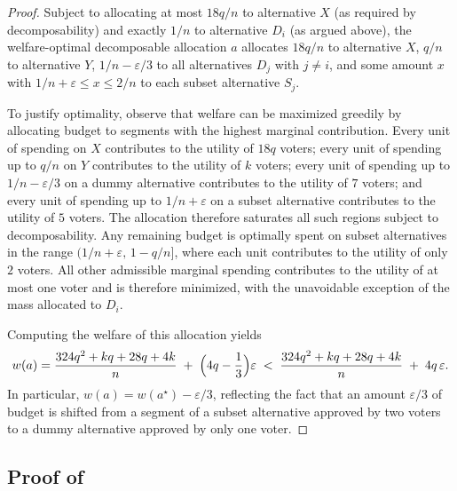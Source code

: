 \documentclass[11pt]{article}
\begin{document}
\begin{proof}
Subject to allocating at most $18q/n$ to alternative $X$ (as required by decomposability) and exactly $1/n$ to alternative $D_i$ (as argued above), the welfare-optimal decomposable allocation $a$ allocates $18q/n$ to alternative $X$, $q/n$ to alternative $Y$, $1/n-\varepsilon/3$ to all alternatives $D_j$ with $j \neq i$, and some amount $x$ with $1/n+\varepsilon \le x \le 2/n$ to each subset alternative $S_j$.

To justify optimality, observe that welfare can be maximized greedily by allocating budget to segments with the highest marginal contribution. Every unit of spending on $X$ contributes to the utility of $18q$ voters; every unit of spending up to $q/n$ on $Y$ contributes to the utility of $k$ voters; every unit of spending up to $1/n-\varepsilon/3$ on a dummy alternative contributes to the utility of $7$ voters; and every unit of spending up to $1/n+\varepsilon$ on a subset alternative contributes to the utility of $5$ voters. The allocation therefore saturates all such regions subject to decomposability. Any remaining budget is optimally spent on subset alternatives in the range $(1/n+\varepsilon,\,1-q/n]$, where each unit contributes to the utility of only $2$ voters. All other admissible marginal spending contributes to the utility of at most one voter and is therefore minimized, with the unavoidable exception of the mass allocated to $D_i$.

Computing the welfare of this allocation yields
\[
w(a)=\frac{324q^{2} + kq + 28q + 4k}{n} \;+\; \Bigl(4q-\frac{1}{3}\Bigr)\varepsilon
\;<\;
\frac{324q^{2} + kq + 28q + 4k}{n} \;+\; 4q\,\varepsilon.
\]
In particular, $w(a)=w(a^\star)-\varepsilon/3$, reflecting the fact that an amount $\varepsilon/3$ of budget is shifted from a segment of a subset alternative approved by two voters to a dummy alternative approved by only one voter.
\end{proof}

\subsection{Proof of }\label{app:thmGreedyDecompTwo}
\thmGreedyDecompTwo*
\end{document}
